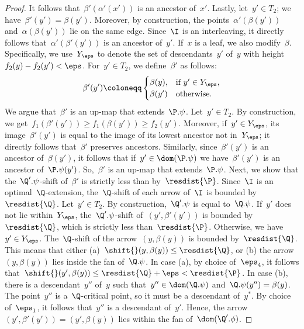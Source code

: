 \begin{proof}
    It follows that~$\beta'(\alpha'(x'))$ is an ancestor of~$x'$.
    Lastly, let~$y' \in T_2$; we have~$\beta'(y') = \beta(y')$.
    Moreover, by construction, the points~$\alpha'(\beta(y'))$ and~$\alpha(\beta(y'))$ lie on the same edge.
    Since~$\I$ is an interleaving, it directly follows that~$\alpha'(\beta'(y'))$ is an ancestor of~$y'$.
%
    If~$x$ is a leaf, we also modify~$\beta$.
    Specifically, we use~$Y_\eps$ to denote the set of descendants~$y'$ of~$y$ with height~$f_2(y) - f_2(y') < \eps$. 
    For~$y' \in T_2$, we define~$\beta'$ as follows:
    \[
        \beta'(y') \coloneqq \begin{cases}
            \beta(y), & \text{if } y' \in Y_\eps, \\
            \beta(y') & \text{otherwise.}
        \end{cases}
    \]
%
    We argue that~$\beta'$ is an up-map that extends~$\P.\psi$.
    Let~$y' \in T_2$.
    By construction, we get~$f_1(\beta'(y')) \ge f_1(\beta(y')) \ge f_2(y')$.
    Moreover, if~$y' \in Y_\eps$, its image~$\beta'(y')$ is equal to the image of its lowest ancestor not in~$Y_\eps$; it directly follows that~$\beta'$ preserves ancestors.
    Similarly, since~$\beta'(y')$ is an ancestor of~$\beta(y')$, it follows that if~$y' \in \dom(\P.\psi)$ we have~$\beta'(y')$ is an ancestor of~$\P.\psi(y')$.
    So,~$\beta'$ is an up-map that extends~$\P.\psi$.
%
    Next, we show that the~$\Q'.\psi$-shift of~$\beta'$ is strictly less than by~$\resdist{\P}$.
    Since~$\I$ is an optimal~$\Q$-extension, the~$\Q$-shift of each arrow of~$\I$ is bounded by~$\resdist{\Q}$.
    Let~$y' \in T_2$.
    By construction,~$\Q'.\psi$ is equal to~$\Q.\psi$.
    If~$y'$ does not lie within~$Y_\eps$, the~$\Q'.\psi$-shift of~$(y', \beta'(y'))$ is bounded by~$\resdist{\Q}$, which is strictly less than~$\resdist{\P}$.
    Otherwise, we have~$y' \in Y_\eps$.
    The~$\Q$-shift of the arrow~$(y, \beta(y))$ is bounded by~$\resdist{\Q}$.
    This means that either (a)~$\shift{}(y, \beta(y)) \le \resdist{\Q}$, or (b) the arrow~$(y, \beta(y))$ lies inside the fan of~$\Q.\psi$.
    In case (a), by choice of~$\eps_4$, it follows that~$\shift{}(y', \beta(y)) \le \resdist{\Q} + \eps < \resdist{\P}$.
    In case (b), there is a descendant~$y''$ of~$y$ such that~$y'' \in \dom(\Q.\psi)$ and~$\Q.\psi(y'') = \beta(y)$.
    The point~$y''$ is a~$\Q$-critical point, so it must be a descendant of~$y^*$.
    By choice of~$\eps_1$, it follows that~$y''$ is a descendant of~$y'$.
    Hence, the arrow~$(y', \beta'(y')) = (y', \beta(y))$ lies within the fan of~$\dom(\Q'.\phi)$.

\end{proof}
